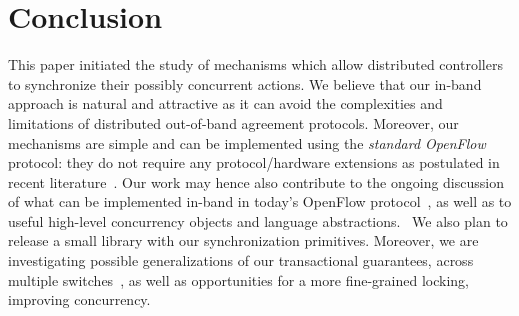\documentclass[conference]{sigcomm-alternate}
\begin{document}

\section{Conclusion}\label{sec:conclusion}

This paper initiated the study of mechanisms which allow distributed controllers
to synchronize their possibly concurrent actions. We believe that our in-band
approach is natural and attractive as it can avoid the
complexities and limitations of distributed out-of-band agreement protocols.
Moreover, our mechanisms are simple and can be implemented using the \emph{standard OpenFlow}
protocol: they do not require any protocol/hardware extensions as postulated in recent literature~\cite{stn,netpaxos}.
Our work may hence also contribute to the ongoing discussion of what can be implemented
in-band in today's OpenFlow protocol~\cite{reclaim},
as well as to useful high-level concurrency objects and
language abstractions.~\cite{pyretic}
We also plan to release a small library with our synchronization primitives. 
Moreover, we are investigating possible generalizations of our transactional guarantees,
across multiple switches~\cite{stn}, as well as opportunities for a more fine-grained
locking, improving concurrency. 

%
\end{document}
